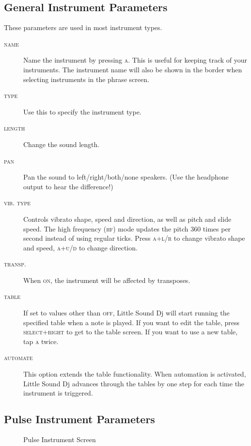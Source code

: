 \subsection{General Instrument Parameters}

These parameters are used in most instrument types.

\begin{description}
	\item[\textsc{name}] Name the instrument by pressing \textsc{a}. This is useful for keeping track of your instruments. The instrument name will also be shown in the border when selecting instruments in the phrase screen.
	\item[\textsc{type}] Use this to specify the instrument type.
	\item[\textsc{length}] Change the sound length.
	\item[\textsc{pan}] Pan the sound to left/right/both/none speakers. (Use the headphone output to hear the difference!)
    \item[\textsc{vib. type}] Controls vibrato shape, speed and direction, as well as pitch and slide speed. The high frequency (\textsc{hf}) mode updates the pitch 360 times per second instead of using regular ticks. Press \textsc{a+l/r} to change vibrato shape and speed, \textsc{a+u/d} to change direction.
    \item[\textsc{transp.}] When \textsc{on}, the instrument will be affected by transposes.
	\item[\textsc{table}] If set to values other than \textsc{off}, Little Sound Dj will start running the specified table when a note is played. If you want to edit the table, press \textsc{select+right} to get to the table screen. If you want to use a new table, tap \textsc{a} twice.
	\item[\textsc{automate}] This option extends the table functionality. When automation is activated, Little Sound Dj advances through the tables by one step for each time the instrument is triggered.
\end{description}

\subsection{Pulse Instrument Parameters}

\begin{figure}[htpb]
	\begin{center}
	\end{center}
	\caption{Pulse Instrument Screen}
	\label{fig:instr-pulse}
\end{figure}

